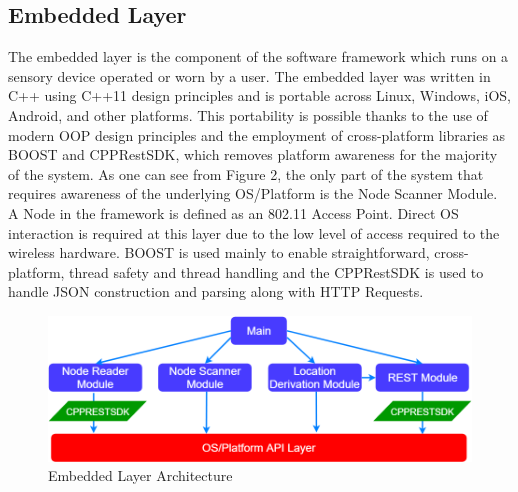 \documentclass[conference]{IEEEtran}
\begin{document}
\subsection{Embedded Layer}
The embedded layer is the component of the software framework which runs on a sensory device operated or worn by a user. The embedded layer was written in C++ using C++11 design principles and is portable across Linux, Windows, iOS, Android, and other platforms. This portability is possible thanks to the use of modern OOP design principles and the employment of  cross-platform libraries as BOOST and CPPRestSDK, which removes platform awareness for the majority of the system. As one can see from Figure 2, the only part of the system that requires awareness of the underlying OS/Platform is the Node Scanner Module. A Node in the framework is defined as an 802.11 Access Point. Direct OS interaction is required at this layer due to the low level of access required to the wireless hardware.
BOOST is used mainly to enable straightforward, cross-platform, thread safety and thread handling and the CPPRestSDK is used to handle JSON construction and parsing along with HTTP Requests.
\begin{figure}[H]
    \includegraphics[width=9 cm,height=3.5 cm]{Pink_Panther_Architecture.png}
    \caption{Embedded Layer Architecture}
    \end{figure}
\end{document}
